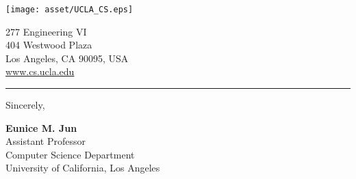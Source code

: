\documentclass[11pt, a4paper, hidelinks]{letter} %
\begin{document}
\begin{minipage}{0.6\textwidth}
\vspace{-17mm}
\texttt{[image: asset/UCLA\_CS.eps]}\\
\end{minipage}
\hfill
\begin{minipage}{0.3\textwidth}\raggedright
\vspace{-20mm}
\footnotesize{
277 Engineering VI\\
404 Westwood Plaza\\
Los Angeles, CA 90095, USA \\
\url{www.cs.ucla.edu}}
\end{minipage}
\hrule
\vspace{3mm}
\rightline{\today}





\vspace{+2mm}
Sincerely,
\vspace{10pt}
\vspace{10pt}


\textbf{Eunice M. Jun}\\
Assistant Professor\\
Computer Science Department \\
University of California, Los Angeles
\end{document}
